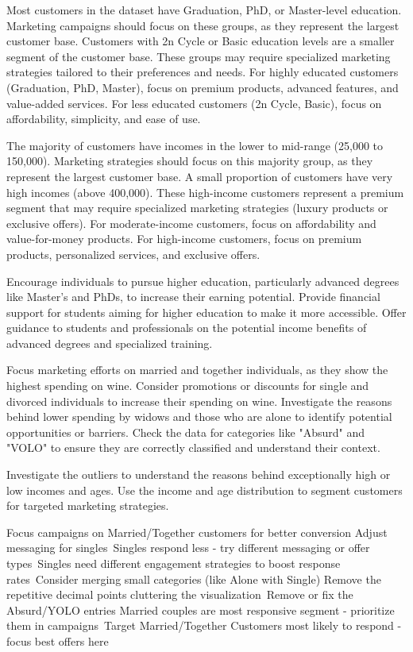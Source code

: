 \documentclass[a4paper]{article}
\begin{document}
\begin{multicols}{2}
Most customers in the dataset have Graduation, PhD, or Master-level education.
Marketing campaigns should focus on these groups, as they represent the largest customer base.
Customers with 2n Cycle or Basic education levels are a smaller segment of the customer base.
These groups may require specialized marketing strategies tailored to their preferences and needs.
For highly educated customers (Graduation, PhD, Master), focus on premium products, advanced features, and value-added services.
For less educated customers (2n Cycle, Basic), focus on affordability, simplicity, and ease of use.



The majority of customers have incomes in the lower to mid-range (25,000 to 150,000).
Marketing strategies should focus on this majority group, as they represent the largest customer base.
A small proportion of customers have very high incomes (above 400,000).
These high-income customers represent a premium segment that may require specialized marketing strategies (luxury products or exclusive offers).
For moderate-income customers, focus on affordability and value-for-money products.
For high-income customers, focus on premium products, personalized services, and exclusive offers.



Encourage individuals to pursue higher education, particularly advanced degrees like Master's and PhDs, to increase their earning potential.
Provide financial support for students aiming for higher education to make it more accessible.
Offer guidance to students and professionals on the potential income benefits of advanced degrees and specialized training.



Focus marketing efforts on married and together individuals, as they show the highest spending on wine.
Consider promotions or discounts for single and divorced individuals to increase their spending on wine.
Investigate the reasons behind lower spending by widows and those who are alone to identify potential opportunities or barriers.
Check the data for categories like "Absurd" and "VOLO" to ensure they are correctly classified and understand their context.


Investigate the outliers to understand the reasons behind exceptionally high or low incomes and ages.
Use the income and age distribution to segment customers for targeted marketing strategies.


Focus campaigns on Married/Together customers for better conversion
Adjust messaging for singles\
Singles respond less - try different messaging or offer types\
Singles need different engagement strategies to boost response rates\
Consider merging small categories (like Alone with Single)
Remove the repetitive decimal points cluttering the visualization\
Remove or fix the Absurd/YOLO entries
Married couples are most responsive segment - prioritize them in campaigns\
Target Married/Together Customers most likely to respond - focus best offers here



\end{multicols}
\end{document}
